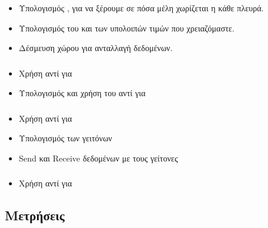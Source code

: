 \documentclass[11pt]{scrartcl} %
\begin{document}
        \subsubsection*{}
            \begin{itemize}
                 \item Υπολογισμός , για να ξέρουμε σε πόσα μέλη χωρίζεται η κάθε πλευρά.
                \item Υπολογισμός του  και των υπολοιπών τιμών που χρειαζόμαστε.
                \item Δέσμευση χώρου για  ανταλλαγή δεδομένων.
            \end{itemize}
        \subsubsection*{}
            \begin{itemize}
                \item Χρήση  αντί για 
                \item Υπολογισμός  και χρήση του αντί για 
            \end{itemize}
        \subsubsection*{}
            \begin{itemize}
                \item Χρήση  αντί για 
                \item Υπολογισμός  των γειτόνων 
                \item Send και Receive δεδομένων με τους γείτονες
            \end{itemize}
        \subsubsection*{}
        \begin{itemize}
            \item Χρήση  αντί για 
        \end{itemize}

    \subsection{Μετρήσεις}
\end{document}
